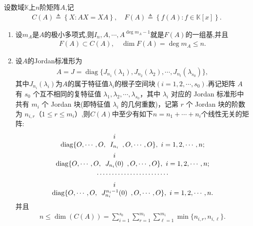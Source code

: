 \documentclass[../../main.tex]{subfiles}%
\begin{document}
\begin{proposition}\label{proposition:矩阵多项式空间的维数等于极小多项式的次数}
设数域$\mathbb{K}$上$n$阶矩阵$A$,记
\begin{align*}
C\left( A \right) \triangleq \left\{ X:AX=XA \right\},\quad
F\left( A \right) \triangleq \left\{ f\left( A \right) :f\in \mathbb{K} \left[ x \right] \right\}.
\end{align*}
\begin{enumerate}[(1)]
\item\label{proposition:矩阵多项式空间的维数等于极小多项式的次数-1} 设$m_A$是$A$的极小多项式,则\(I_n, A, \cdots, A^{\deg m_A - 1}\)就是$F(A)$的一组基,并且
\begin{align*}
F(A)\subset C(A),\quad \dim F(A)=\deg m_A\leqslant n.
\end{align*}

\item\label{proposition:矩阵多项式空间的维数等于极小多项式的次数-2} 设\(A\)的Jordan标准形为
\begin{align*}
A = J = \operatorname{diag}\{J_{n_1}(\lambda_1), J_{n_2}(\lambda_2), \cdots, J_{n_t}(\lambda_{s_0})\},
\end{align*}
其中$J_{n_i}(\lambda_i)$为$A$的属于特征值$\lambda_i$的根子空间块$(i=1,2,\cdots,s_0)$.再记矩阵 \(A\) 有 \(s_0\) 个互不相同的复特征值 \(\lambda_1, \lambda_2, \cdots, \lambda_{s_0}\)，其中 \(\lambda_i\) 对应的 Jordan 标准形中共有 \(m_i\) 个 Jordan 块(即特征值 \(\lambda_i\) 的几何重数)，记第 \(r\) 个 Jordan 块的阶数为 \(n_{i,r}\)（\(1 \leqslant r \leqslant m_i\)）,则$C(A)$中至少有如下$n=n_1+\cdots+n_i$个线性无关的矩阵:
\begin{gather*}
\operatorname{diag}\{O, \cdots, O, \begin{array}[b]{c} i \\ I_{n_i} \end{array}, O, \cdots, O\},\,\,i=1,2,\cdots,n;\\
\operatorname{diag}\{O, \cdots, O, \begin{array}[b]{c} i \\ J_{n_i}(0) \end{array}, O, \cdots, O\},\,\,i=1,2,\cdots,n;\\
\cdots \cdots \cdots \cdots \cdots \cdots \cdots \cdots\\
\operatorname{diag}\{O, \cdots, O, \begin{array}[b]{c} i \\ J_{n_i}^{n_i-1}(0) \end{array}, O, \cdots, O\},\,\,i=1,2,\cdots,n.
\end{gather*}
并且
\begin{align*}
n\leqslant \dim(C(A)) =\sum_{i = 1}^{s_0}\sum_{r = 1}^{m_i}\sum_{\ell = 1}^{m_i}\min\{n_{i,r}, n_{i,\ell}\}.
\end{align*}
\end{enumerate}
\end{proposition}
\end{document}
